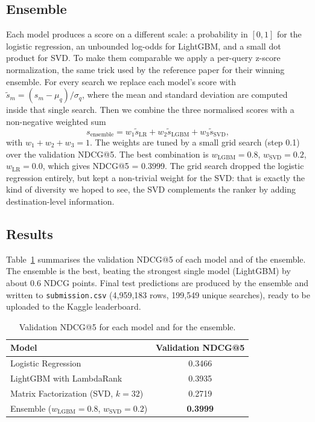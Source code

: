 \documentclass[runningheads]{llncs}
\begin{document}
\subsection{Ensemble}
Each model produces a score on a different scale: a probability in $[0, 1]$ for the logistic regression, an unbounded log-odds for LightGBM, and a small dot product for SVD. To make them comparable we apply a per-query z-score normalization, the same trick used by the reference paper for their winning ensemble. For every search we replace each model's score with $\tilde{s}_m = (s_m - \mu_q) / \sigma_q$, where the mean and standard deviation are computed inside that single search. Then we combine the three normalised scores with a non-negative weighted sum
\[
    s_\text{ensemble} = w_1 \tilde{s}_\text{LR} + w_2 \tilde{s}_\text{LGBM} + w_3 \tilde{s}_\text{SVD},
\]
with $w_1 + w_2 + w_3 = 1$. The weights are tuned by a small grid search (step 0.1) over the validation NDCG@5. The best combination is $w_\text{LGBM} = 0.8$, $w_\text{SVD} = 0.2$, $w_\text{LR} = 0.0$, which gives NDCG@5 = 0.3999. The grid search dropped the logistic regression entirely, but kept a non-trivial weight for the SVD: that is exactly the kind of diversity we hoped to see, the SVD complements the ranker by adding destination-level information.

\subsection{Results}
Table~\ref{tab:results} summarises the validation NDCG@5 of each model and of the ensemble. The ensemble is the best, beating the strongest single model (LightGBM) by about 0.6 NDCG points. Final test predictions are produced by the ensemble and written to \texttt{submission.csv} (4{,}959{,}183 rows, 199{,}549 unique searches), ready to be uploaded to the Kaggle leaderboard.

\begin{table}[ht]
\centering
\renewcommand{\arraystretch}{1.15}
\caption{Validation NDCG@5 for each model and for the ensemble.}\label{tab:results}
\begin{tabular}{|l|c|}
\hline
\textbf{Model} & \textbf{Validation NDCG@5} \\
\hline
Logistic Regression                  & 0.3466 \\
\hline
LightGBM with LambdaRank             & 0.3935 \\
\hline
Matrix Factorization (SVD, $k=32$)   & 0.2719 \\
\hline
Ensemble ($w_\text{LGBM}=0.8$, $w_\text{SVD}=0.2$) & \textbf{0.3999} \\
\hline
\end{tabular}
\end{table}
\end{document}
